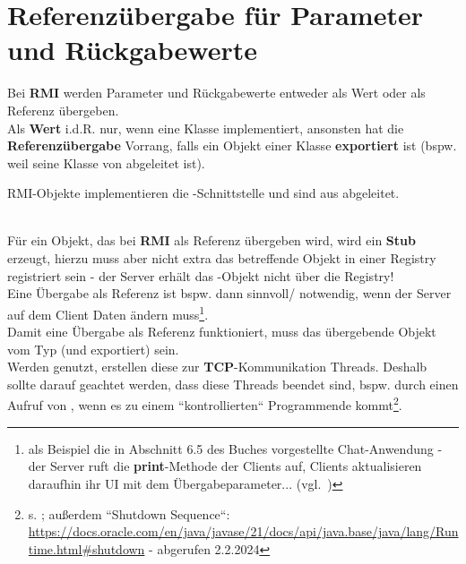 \section{Referenzübergabe für Parameter und Rückgabewerte}\label{sec:refrmi}

Bei \textbf{RMI} werden Parameter und Rückgabewerte entweder als Wert oder als Referenz übergeben.\\

\noindent
Als \textbf{Wert} i.d.R. nur, wenn eine Klasse  implementiert, ansonsten hat die \textbf{Referenzübergabe} Vorrang, falls ein Objekt einer Klasse \textbf{exportiert} ist (bspw. weil seine Klasse von  abgeleitet ist).

\begin{tcolorbox}[enlarge top by=0.5cm,enlarge bottom by=0.5cm]
    RMI-Objekte implementieren die -Schnittstelle und sind aus  abgeleitet.
\end{tcolorbox}\\

\noindent
Für ein Objekt, das bei \textbf{RMI} als Referenz übergeben wird, wird ein \textbf{Stub} erzeugt, hierzu muss aber nicht extra das betreffende Objekt in einer Registry registriert sein - der Server erhält das -Objekt nicht über die Registry!\\

\noindent
Eine Übergabe als Referenz ist bspw. dann sinnvoll/ notwendig, wenn der Server auf dem Client Daten ändern muss\footnote{als Beispiel die in Abschnitt 6.5 des Buches vorgestellte Chat-Anwendung - der Server ruft die \textbf{print}-Methode der Clients auf, Clients aktualisieren daraufhin ihr UI mit dem Übergabeparameter... (vgl.~\cite[Listing 6.22, Listing 6.24]{Oec22})}.\\

\noindent
Damit eine Übergabe als Referenz funktioniert, muss das übergebende Objekt vom Typ  (und exportiert) sein.\\

\noindent
Werden  genutzt, erstellen diese zur \textbf{TCP}-Kommunikation Threads.
Deshalb sollte darauf geachtet werden, dass diese Threads beendet sind, bspw. durch einen Aufruf von , wenn es zu einem ``kontrollierten`` Programmende kommt\footnote{s. \cite[352]{Oec22}; außerdem ``Shutdown Sequence``: \url{https://docs.oracle.com/en/java/javase/21/docs/api/java.base/java/lang/Runtime.html#shutdown} - abgerufen 2.2.2024
}.

